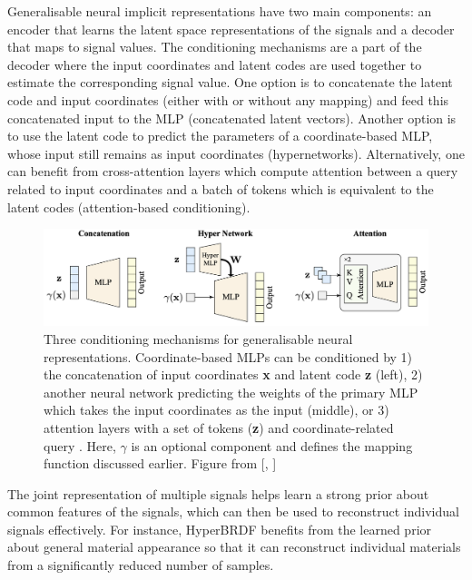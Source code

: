 Generalisable neural implicit representations have two main components: an encoder that learns the latent space representations of the signals and a decoder that maps to signal values. The conditioning mechanisms are a part of the decoder where the input coordinates and latent codes are used together to estimate the corresponding signal value. One option is to concatenate the latent code and input coordinates (either with or without any mapping) and feed this concatenated input to the \gls{MLP} (concatenated latent vectors). Another option is to use the latent code to predict the parameters of a coordinate-based \gls{MLP}, whose input still remains as input coordinates (hypernetworks). Alternatively, one can benefit from cross-attention layers which compute attention between a query related to input coordinates and a batch of tokens which is equivalent to the latent codes (attention-based conditioning). 


\begin{figure}[ht]
  \centering
   \includegraphics[width=\linewidth]{Images/conditioning-mechs.png}
   \caption{Three conditioning mechanisms for generalisable neural representations. Coordinate-based MLPs can be conditioned by 1) the concatenation of input coordinates \textbf{x} and latent code \textbf{z} (left), 2) another neural network predicting the weights of the primary MLP which takes the input coordinates as the input (middle), or 3) attention layers with a set of tokens (\textbf{z}) and coordinate-related query . Here, $\gamma$ is an optional component and defines the mapping function discussed earlier. Figure from [\citeauthor{rebain2022attention}, \citeyear{rebain2022attention}]}
   \label{fig:gnfs}
\end{figure}


The joint representation of multiple signals helps learn a strong prior about common features of the signals, which can then be used to reconstruct individual signals effectively. For instance, HyperBRDF benefits from the learned prior about general material appearance so that it can reconstruct individual materials from a significantly reduced number of samples.  



